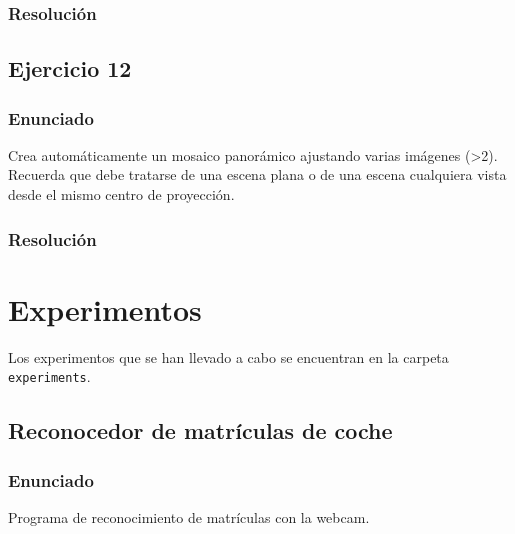 \documentclass[a4paper,10pt,titlepage,oneside,openright]{book}
\begin{document}
\subsubsection*{Resolución}



\medskip
\subsection{Ejercicio 12}

\subsubsection*{Enunciado}
Crea automáticamente un mosaico panorámico ajustando varias imágenes (>2). Recuerda que debe tratarse de una escena plana o de una escena cualquiera vista desde el mismo centro de proyección.

\subsubsection*{Resolución}




\medskip
\section{Experimentos}
Los experimentos que se han llevado a cabo se encuentran en la carpeta \texttt{experiments}.

\medskip
\subsection{Reconocedor de matrículas de coche}

\subsubsection*{Enunciado}
Programa de reconocimiento de matrículas con la webcam.

\end{document}
